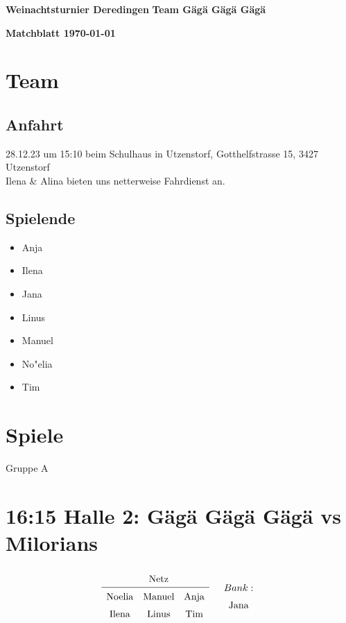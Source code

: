 \documentclass[DIN, pagenumber=false, fontsize=11pt, parskip=half]{scrartcl}
\newcommand{\mytitle}[1]{{\noindent\Large\textbf{#1}}}
\begin{document}
\noindent\textbf{Weinachtsturnier Deredingen} \hfill \textbf{Team Gägä Gägä Gägä}\\
\hfill
\begin{flushright}
\end{flushright}


\mytitle{Matchblatt \hfill \today}
\section*{Team}
\subsection*{Anfahrt}
28.12.23 um 15:10 beim Schulhaus in Utzenstorf, Gotthelfstrasse 15, 3427 Utzenstorf \\
Ilena \& Alina bieten uns netterweise Fahrdienst an. 
\subsection*{Spielende}
\begin{multicols}{2}
\begin{itemize}[noitemsep]
    \item Anja 
    \item Ilena
    \item Jana
    \item Linus
    \item Manuel
    \item No"elia
    \item Tim
\end{itemize}
\end{multicols}
\section*{Spiele}
Gruppe A
\section*{16:15 Halle 2: Gägä Gägä Gägä vs Milorians}
\[
    \begin{array}{cc}
\renewcommand{\arraystretch}{1.5}
\begin{array}{ccc}
& \text{Netz} & \\    
\hline
\text{Noelia} & \text{Manuel} & \text{Anja} \\
\text{Ilena} & \text{Linus} & \text{Tim} \\
\end{array} & \begin{array}{c}Bank: \\ \text{Jana}\end{array}
\end{array}
\]
\end{document}
